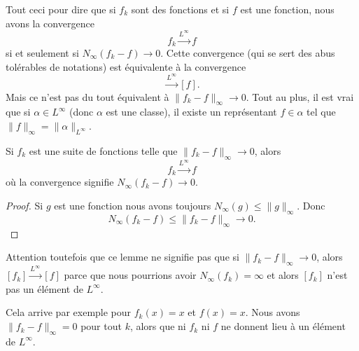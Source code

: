 \begin{normaltext}
	Tout ceci pour dire que si \( f_k\) sont des fonctions et si \( f\) est une fonction, nous avons la convergence
	\begin{equation}
		f_k\stackrel{L^{\infty}}{\longrightarrow}f
	\end{equation}
	si et seulement si \( N_{\infty}(f_k-f)\to 0\). Cette convergence (qui se sert des abus tolérables de notations) est équivalente à la convergence
	\begin{equation}
		[f_k]\stackrel{L^{\infty}}{\longrightarrow}[f].
	\end{equation}
	Mais ce n'est pas du tout équivalent à \( \| f_k -f \|_{\infty}\to 0\). Tout au plus, il est vrai que si \( \alpha\in L^{\infty}\) (donc \( \alpha\) est une classe), il existe un représentant \( f\in \alpha\) tel que \( \| f \|_{\infty}=\|\alpha\|_{L^{\infty}}\).
\end{normaltext}

\begin{lemma}
	Si \( f_k\) est une suite de fonctions telle que \( \| f_k-f \|_{\infty}\to 0\), alors
	\begin{equation}
		f_k\stackrel{L^{\infty}}{\longrightarrow}f
	\end{equation}
	où la convergence signifie \( N_{\infty}(f_k-f)\to 0\).
\end{lemma}

\begin{proof}
	Si \( g\) est une fonction nous avons toujours \( N_{\infty}(g)\leq \| g \|_{\infty}\). Donc
	\begin{equation}
		N_{\infty}(f_k-f)\leq \| f_k-f \|_{\infty}\to 0.
	\end{equation}
\end{proof}

\begin{normaltext}
	Attention toutefois que ce lemme ne signifie pas que si \( \| f_k-f \|_{\infty}\to 0\), alors \(  [f_k]\stackrel{L^{\infty}}{\longrightarrow}[f]  \) parce que nous pourrions avoir \( N_{\infty}(f_k)=\infty\) et alors \( [f_k]\) n'est pas un élément de \( L^{\infty}\).

	Cela arrive par exemple pour \( f_k(x)=x\) et \( f(x)=x\). Nous avons \( \| f_k-f \|_{\infty}=0\) pour tout \( k\), alors que ni \( f_k\) ni \( f\) ne donnent lieu à un élément de \( L^{\infty}\).
\end{normaltext}


